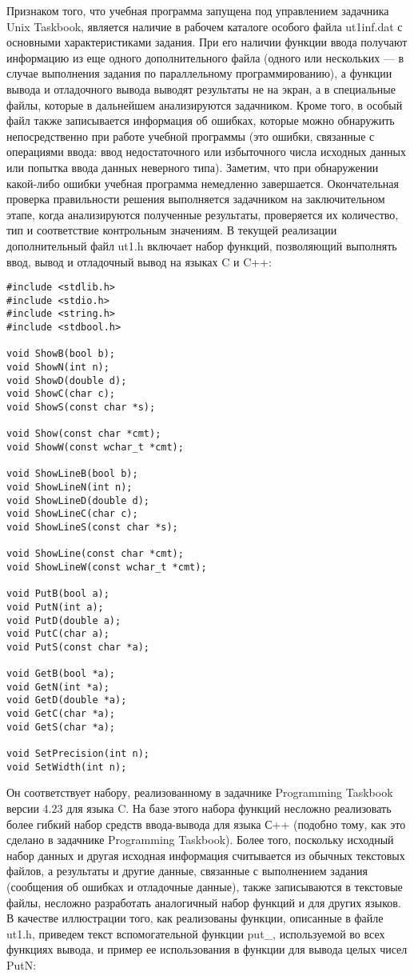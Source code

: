 Признаком того, что учебная программа запущена под управлением задачника Unix Taskbook, является наличие в рабочем каталоге особого файла ut1inf.dat с основными характеристиками задания. При его наличии функции ввода получают информацию из еще одного дополнительного файла (одного или нескольких — в случае выполнения задания по параллельному программированию), а функции вывода и отладочного вывода выводят результаты не на экран, а в специальные файлы, которые в дальнейшем анализируются задачником. Кроме того, в особый файл также записывается информация об ошибках, которые можно обнаружить непосредственно при работе учебной программы (это ошибки, связанные с операциями ввода: ввод недостаточного или избыточного числа исходных данных или попытка ввода данных неверного типа). Заметим, что при обнаружении какой-либо ошибки учебная программа немедленно завершается. Окончательная проверка правильности решения выполняется задачником на заключительном этапе, когда анализируются полученные результаты, проверяется их количество, тип и соответствие контрольным значениям.
В текущей реализации дополнительный файл ut1.h включает набор функций, позволяющий выполнять ввод, вывод и отладочный вывод на языках C и C++:

\lstset{language=c++}
\begin{lstlisting}
#include <stdlib.h>
#include <stdio.h>
#include <string.h>
#include <stdbool.h>
    
void ShowB(bool b);
void ShowN(int n);
void ShowD(double d);
void ShowC(char c);
void ShowS(const char *s);
    
void Show(const char *cmt);
void ShowW(const wchar_t *cmt);
    
void ShowLineB(bool b);
void ShowLineN(int n);
void ShowLineD(double d);
void ShowLineC(char c);
void ShowLineS(const char *s);
    
void ShowLine(const char *cmt);
void ShowLineW(const wchar_t *cmt);
    
void PutB(bool a);
void PutN(int a);
void PutD(double a);
void PutC(char a);
void PutS(const char *a);
    
void GetB(bool *a);
void GetN(int *a);
void GetD(double *a);
void GetC(char *a);
void GetS(char *a);
    
void SetPrecision(int n);
void SetWidth(int n);
\end{lstlisting}

Он соответствует набору, реализованному в задачнике Programming Taskbook версии 4.23 для языка C. На базе этого набора функций несложно реализовать более гибкий набор средств ввода-вывода для языка С++ (подобно тому, как это сделано в задачнике Programming Taskbook). Более того, поскольку исходный набор данных и другая исходная информация считывается из обычных текстовых файлов, а результаты и другие данные, связанные с выполнением задания (сообщения об ошибках и отладочные данные), также записываются в текстовые файлы, несложно разработать аналогичный набор функций и для других языков.
В качестве иллюстрации того, как реализованы функции, описанные в файле ut1.h, приведем текст вспомогательной функции put\_, используемой во всех функциях вывода, и пример ее использования в функции для вывода целых чисел PutN:


